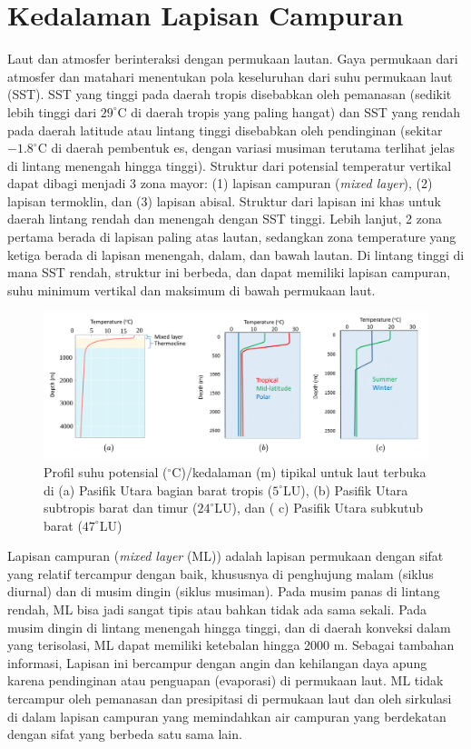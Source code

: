 \section[Kedalaman Lapisan Campuran]{Kedalaman Lapisan Campuran}
\begin{spacing}{1.5}
	Laut dan atmosfer berinteraksi dengan permukaan lautan. Gaya permukaan dari atmosfer dan matahari menentukan pola keseluruhan dari suhu permukaan laut (SST). SST yang tinggi pada daerah tropis disebabkan oleh pemanasan (sedikit lebih tinggi dari $29^\circ$C di daerah tropis yang paling hangat) dan SST yang rendah pada daerah latitude atau lintang tinggi disebabkan oleh pendinginan (sekitar $-1.8^\circ$C di daerah pembentuk es, dengan variasi musiman terutama
	terlihat jelas di lintang menengah hingga tinggi). Struktur dari potensial temperatur vertikal dapat dibagi menjadi 3 zona mayor: (1) lapisan campuran (\textit{mixed layer}), (2) lapisan termoklin, dan (3) lapisan abisal. Struktur dari lapisan ini khas untuk daerah lintang rendah dan menengah dengan SST tinggi. Lebih lanjut, 2 zona pertama berada di lapisan paling atas lautan, sedangkan zona temperature yang ketiga berada di lapisan menengah, dalam, dan bawah lautan. Di lintang tinggi di mana SST rendah, struktur ini berbeda, dan dapat memiliki lapisan campuran, suhu minimum vertikal dan maksimum di bawah permukaan laut.
	
	\begin{figure}[H]
		\centering
		\includegraphics[width=13cm]{contents/mld_theory}
		\caption{Profil suhu potensial ($^\circ$C)/kedalaman (m) tipikal untuk laut terbuka di (a) Pasifik Utara bagian barat tropis ($5^\circ$LU), (b) Pasifik Utara subtropis barat dan timur ($24^\circ$LU), dan ( c) Pasifik Utara subkutub barat ($47^\circ$LU) \protect{}}
		\label{fig:mld_theory}
	\end{figure}
	Lapisan campuran (\textit{mixed layer} (ML)) adalah lapisan permukaan dengan sifat yang relatif tercampur dengan baik, khususnya di penghujung malam (siklus diurnal) dan di musim dingin (siklus musiman). Pada musim panas di lintang rendah, ML bisa jadi sangat tipis atau bahkan tidak ada sama sekali. Pada musim dingin di lintang menengah hingga tinggi, dan di daerah konveksi dalam yang terisolasi, ML dapat memiliki ketebalan hingga 2000 m. Sebagai tambahan informasi, Lapisan ini bercampur dengan angin dan kehilangan daya apung karena pendinginan atau penguapan (evaporasi) di permukaan laut. ML tidak tercampur oleh pemanasan dan presipitasi di permukaan laut dan oleh sirkulasi di dalam lapisan campuran yang memindahkan air campuran yang berdekatan dengan sifat yang berbeda satu sama lain.
	

\end{spacing}
